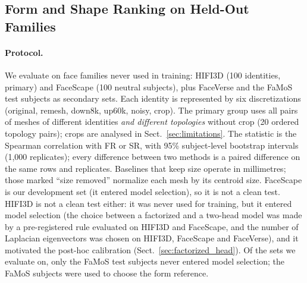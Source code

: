 \documentclass[10pt,twocolumn,letterpaper]{article}
\begin{document}

\subsection{Form and Shape Ranking on Held-Out Families}
\label{sec:factorized_results}
\paragraph{Protocol.} We evaluate on face families never used in training: HIFI3D (100 identities, primary) and FaceScape (100 neutral subjects), plus FaceVerse and the FaMoS test subjects as secondary sets. Each identity is represented by six discretizations (original, remesh, down8k, up60k, noisy, crop). The primary group uses all pairs of meshes of different identities \emph{and different topologies} without crop (20 ordered topology pairs); crops are analysed in Sect.~\ref{sec:limitations}. The statistic is the Spearman correlation with FR or SR, with 95\% subject-level bootstrap intervals (1{,}000 replicates); every difference between two methods is a paired difference on the same rows and replicates. Baselines that keep size operate in millimetres; those marked ``size removed'' normalize each mesh by its centroid size. FaceScape is our development set (it entered model selection), so it is not a clean test. HIFI3D is not a clean test either: it was never used for training, but it entered model selection (the choice between a factorized and a two-head model was made by a pre-registered rule evaluated on HIFI3D and FaceScape, and the number of Laplacian eigenvectors was chosen on HIFI3D, FaceScape and FaceVerse), and it motivated the post-hoc calibration (Sect.~\ref{sec:factorized_head}). Of the sets we evaluate on, only the FaMoS test subjects never entered model selection; the FaMoS subjects were used to choose the form reference.
\end{document}
